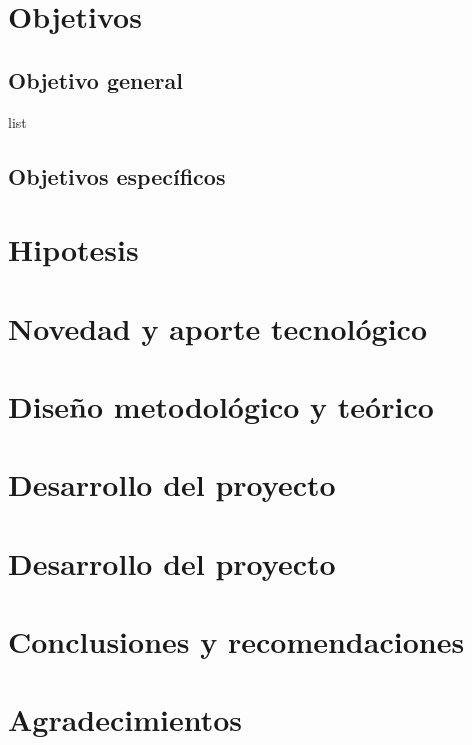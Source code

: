 \documentclass{sig-alternate}
\begin{document}
\section{Objetivos}

\subsection{Objetivo general}

list

\subsection{Objetivos espec\'ificos}

\section{Hipotesis}

\section{Novedad y aporte tecnol\'ogico}

\section{Dise\~no metodol\'ogico y te\'orico}

\section{Desarrollo del proyecto}

\section{Desarrollo del proyecto}


\section{Conclusiones y recomendaciones}



\section{Agradecimientos}
\end{document}
